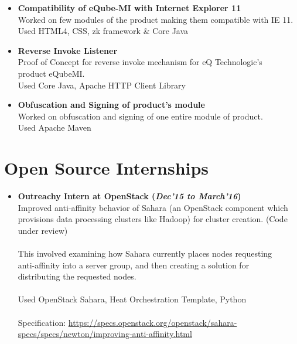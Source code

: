 \documentclass[margin,line]{res}
\begin{document}
\begin{resume}
\begin{itemize}
\item \textbf{Compatibility of eQube-MI with Internet Explorer 11}\\
Worked on few modules of the product making them compatible with IE 11.\\
Used HTML4, CSS, zk framework \& Core Java\\

\item \textbf{Reverse Invoke Listener}\\
Proof of Concept for reverse invoke mechanism for eQ Technologic's\\ product eQubeMI. \\
Used Core Java, Apache HTTP Client Library\\

\item \textbf{Obfuscation and Signing of product's module}\\
Worked on obfuscation and signing of one entire module of product.\\
Used Apache Maven


\end{itemize}

\section{Open Source Internships}
\begin{itemize} \itemsep -4pt

\item \textbf{Outreachy Intern at OpenStack (\emph{Dec'15 to March'16})} \\
Improved anti-affinity behavior of Sahara (an OpenStack component which \\ provisions data processing clusters like Hadoop) for cluster creation. (Code under review)\\\\
This involved examining how Sahara currently places nodes requesting \\ anti-affinity into a server group, and then creating a solution for \\ distributing the requested nodes.\\\\
Used OpenStack Sahara, Heat Orchestration Template, Python\\\\
Specification: \url{https://specs.openstack.org/openstack/sahara-specs/specs/newton/improving-anti-affinity.html}\\



\end{itemize}
\end{resume}
\end{document}
